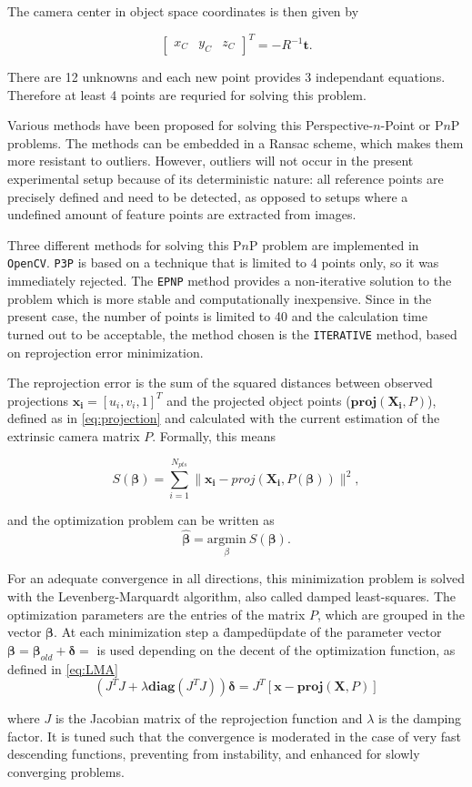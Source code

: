 The camera center in object space coordinates is then given by

\begin{equation}
    \begin{bmatrix} x_C & y_C & z_C \end{bmatrix}^T = -R^{-1} \mathbf{t}.
\end{equation}

There are 12 unknowns and each new point provides 3 independant equations. Therefore at least 4 points are requried for solving this problem.

Various methods have been proposed for solving this Perspective-$n$-Point or P$n$P problems. 
The methods can be embedded in a Ransac scheme, which makes them more resistant to outliers. 
However, outliers will not occur in the present experimental setup because of its deterministic nature: all reference points are precisely defined and need to be detected, as opposed to setups where a undefined amount of feature points are extracted from images.

Three different methods for solving this P$n$P problem are implemented in \texttt{OpenCV}.
\texttt{P3P} is based on a technique that is limited to 4 points only, so it was immediately rejected. The \texttt{EPNP} method \cite{Lepetit2009} provides a non-iterative solution to the problem which is more stable and computationally inexpensive. Since in the present case, the number of points is limited to 40 and the calculation time turned out to be acceptable, the method chosen is the \texttt{ITERATIVE} method, based on reprojection error minimization.

The reprojection error is the sum of the squared distances between observed projections $\mathbf{x_i}=[u_i,v_i,1]^T$ and the projected object points ($\mathbf{proj}(\mathbf{X_i},P)$), defined as in \eqref{eq:projection} and calculated with the current estimation of the extrinsic camera matrix $P$. Formally, this means

\begin{equation}
S(\boldsymbol\beta) = \sum_{i=1}^{N_{pts}} \| \mathbf{x_i}-proj(\mathbf{X_i},P(\boldsymbol\beta)) \| ^2 ,
\end{equation}

and the optimization problem can be written as
\begin{equation}
    \hat{\boldsymbol\beta} = \underset{\beta} {\mathrm{argmin}} ~S(\boldsymbol\beta).
\end{equation}

For an adequate convergence in all directions, this minimization problem is solved with the Levenberg-Marquardt algorithm, also called damped least-squares. The optimization parameters are the entries of the matrix $P$, which are grouped in the vector $\boldsymbol\beta$. At each minimization step a \"damped\" update of the parameter vector $\boldsymbol\beta=\boldsymbol\beta_{old}+\boldsymbol\delta=$ is used depending on the decent of the optimization function, as defined in \eqref{eq:LMA} \cite{LMA}
\begin{equation}
    (J^TJ + \lambda \mathbf{diag}(J^TJ))\boldsymbol\delta = J^T[\mathbf{x}-\mathbf{proj}(\mathbf{X},P)]
\label{eq:LMA}
\end{equation}

where $J$ is the Jacobian matrix of the reprojection function and $\lambda$ is the damping factor. It is tuned such that
the convergence is moderated in the case of very fast descending functions, preventing from instability, and enhanced for slowly converging problems.
